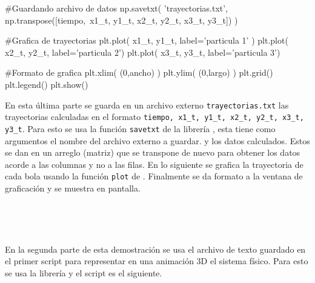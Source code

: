 \begin{listing}[style=python, numbers = none]
#Guardando archivo de datos
np.savetxt( 'trayectorias.txt', np.transpose([tiempo,\
x1_t, y1_t, x2_t, y2_t, x3_t, y3_t]) )

#Grafica de trayectorias
plt.plot( x1_t, y1_t, label='particula 1' )
plt.plot( x2_t, y2_t, label='particula 2')
plt.plot( x3_t, y3_t, label='particula 3')

#Formato de grafica
plt.xlim( (0,ancho) )
plt.ylim( (0,largo) )
plt.grid()
plt.legend()
plt.show()
\end{listing}
En esta última parte se guarda en un archivo externo \texttt{trayectorias.txt}
las trayectorias calculadas en el formato \texttt{tiempo, x1\_t, y1\_t, 
x2\_t, y2\_t, x3\_t, y3\_t}. Para esto se usa la función \texttt{savetxt}
de la librería \numpy, esta tiene como argumentos el nombre del archivo 
externo a guardar. y los datos calculados. Estos se dan en un arreglo 
(matriz) que se transpone de nuevo para obtener los datos acorde a las 
columnas y no a las filas. En lo siguiente se grafica la trayectoria 
de cada bola usando la función \texttt{plot} de \matplotlib. Finalmente
se da formato a la ventana de graficación y se muestra en pantalla.

\

\

En la segunda parte de esta demostración se usa el archivo de texto guardado
en el primer script para representar en una animación 3D el sistema físico.
Para esto se usa la librería \mayavi y el script es el siguiente.



